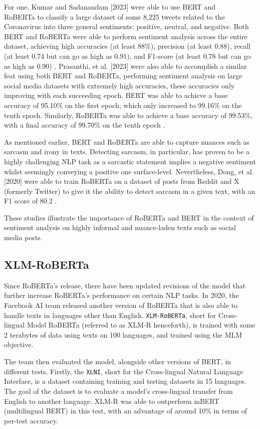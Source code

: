 For one, Kumar and Sadanandam [2023] were able to use BERT and\\RoBERTa to classify a large dataset of some 8,225 tweets related to the Coronavirus into three general sentiments: positive, neutral, and negative. Both BERT and RoBERTa were able to perform sentiment analysis across the entire dataset, achieving high accuracies (at least 88\%), precision (at least 0.88), recall (at least 0.74 but can go as high as 0.91), and F1-score (at least 0.78 but can go as high as 0.90) \cite{RRL_Pranay-Kumar-2023}. Prasanthi, et al. [2023] were also able to accomplish a similar feat using both BERT and RoBERTa, performing sentiment analysis on large social media datasets with extremely high accuracies, these accuracies only improving with each succeeding epoch. BERT was able to achieve a base accuracy of 95.10\% on the first epoch, which only increased to 99.16\% on the tenth epoch. Similarly, RoBERTa was able to achieve a base accuracy of 99.53\%, with a final accuracy of 99.70\% on the tenth epoch \cite{RRL_Prasanthi-2023}.

As mentioned earlier, BERT and RoBERTa are able to capture nuances such as sarcasm and irony in texts. Detecting sarcasm, in particular, has proven to be a highly challenging NLP task as a sarcastic statement implies a negative sentiment whilst seemingly conveying a positive one surface-level. Nevertheless, Dong, et al. [2020] were able to train RoBERTa on a dataset of posts from Reddit and X (formerly Twitter) to give it the ability to detect sarcasm in a given text, with an F1 score of 80.2 \cite{RRL_Dong-2020}.

These studies illustrate the importance of RoBERTa and BERT in the context of sentiment analysis on highly informal and nuance-laden texts such as social media posts.

\subsection{XLM-RoBERTa}
Since RoBERTa’s release, there have been updated revisions of the model that further increase RoBERTa’s performance on certain NLP tasks. In 2020, the Facebook AI team released another version of RoBERTa that is also able to handle texts in languages other than English. \texttt{XLM-RoBERTa}, short for Cross-lingual Model RoBERTa (referred to as XLM-R henceforth), is trained with some 2 terabytes of data using texts on 100 languages, and trained using the MLM objective. 

The team then evaluated the model, alongside other versions of BERT, in different tests. Firstly, the \texttt{XLNI}, short for the Cross-lingual Natural Language Interface, is a dataset containing training and testing datasets in 15 languages. The goal of the dataset is to evaluate a model’s cross-lingual transfer from English to another language. XLM-R was able to outperform mBERT (multilingual BERT) in this test, with an advantage of around 10\% in terms of per-test accuracy.

